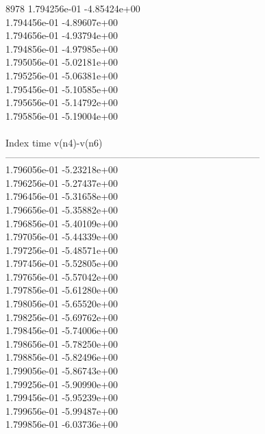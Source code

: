 8978	1.794256e-01	-4.85424e+00	\\ 	1.794456e-01	-4.89607e+00	\\ 	1.794656e-01	-4.93794e+00	\\ 	1.794856e-01	-4.97985e+00	\\ 	1.795056e-01	-5.02181e+00	\\ 	1.795256e-01	-5.06381e+00	\\ 	1.795456e-01	-5.10585e+00	\\ 	1.795656e-01	-5.14792e+00	\\ 	1.795856e-01	-5.19004e+00	\\ \hline
\\ \hline
Index   time            v(n4)-v(n6)     \\ \hline
--------------------------------------------------------------------------------\\ 	1.796056e-01	-5.23218e+00	\\ 	1.796256e-01	-5.27437e+00	\\ 	1.796456e-01	-5.31658e+00	\\ 	1.796656e-01	-5.35882e+00	\\ 	1.796856e-01	-5.40109e+00	\\ 	1.797056e-01	-5.44339e+00	\\ 	1.797256e-01	-5.48571e+00	\\ 	1.797456e-01	-5.52805e+00	\\ 	1.797656e-01	-5.57042e+00	\\ 	1.797856e-01	-5.61280e+00	\\ 	1.798056e-01	-5.65520e+00	\\ 	1.798256e-01	-5.69762e+00	\\ 	1.798456e-01	-5.74006e+00	\\ 	1.798656e-01	-5.78250e+00	\\ 	1.798856e-01	-5.82496e+00	\\ 	1.799056e-01	-5.86743e+00	\\ 	1.799256e-01	-5.90990e+00	\\ 	1.799456e-01	-5.95239e+00	\\ 	1.799656e-01	-5.99487e+00	\\ 	1.799856e-01	-6.03736e+00	\\ \hline
